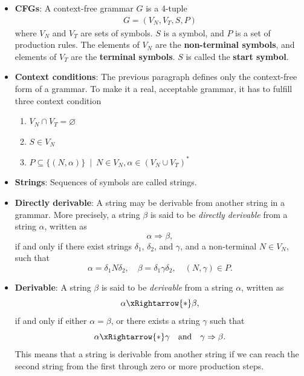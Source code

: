 \documentclass{report}
\begin{document}
\begin{itemize}
        \item \textbf{CFGs}: A context-free grammar $G$ is a 4-tuple
            \begin{align*}
                G = (V_{N}, V_{T}, S, P)
            \end{align*}
            where $V_{N}$ and $V_{T}$ are sets of symbols. $S$ is a symbol, and $P$ is a set of production rules. The elements of $V_{N}$ are the \textbf{non-terminal symbols}, and elements of $V_{T} $ are the \textbf{terminal symbols}. $S$ is called the \textbf{start symbol}.
        \item \textbf{Context conditions}: The previous paragraph defines only the context-free form of a grammar. To make it a real, acceptable grammar, it has to fulfill three context condition
            \begin{enumerate}
                \item $V_{N} \cap V_{T} = \varnothing $
                \item $S \in V_{N}$
                \item $P \subseteq \{(N,\alpha)\} \ \mid \ N \in V_{N}, \alpha \in (V_{N} \cup V_{T})^{*} $
            \end{enumerate}
        \item \textbf{Strings}: Sequences of symbols are called strings. 
        \item \textbf{Directly derivable}: A string may be derivable from another string in a grammar. More precisely, a string $\beta$ is said to be \emph{directly derivable} from a string $\alpha$, written as
            \[
                \alpha \Rightarrow \beta,
            \]
            if and only if there exist strings $\delta_1$, $\delta_2$, and $\gamma$, and a non-terminal
            $N \in V_N$, such that
            \[
                \alpha = \delta_1 N \delta_2, \quad
                \beta = \delta_1 \gamma \delta_2, \quad
                (N, \gamma) \in P.
            \]
        \item \textbf{Derivable}: 
            A string $\beta$ is said to be \emph{derivable} from a string $\alpha$, written as
            \[
                \alpha \xRightarrow{*} \beta,
            \]
            if and only if either $\alpha = \beta$, or there exists a string $\gamma$ such that
            \[
                \alpha \xRightarrow{*} \gamma \quad \text{and} \quad \gamma \Rightarrow \beta.
            \]
            This means that a string is derivable from another string if we can reach the second string from the first through zero or more production steps. 

\end{itemize}
\end{document}

